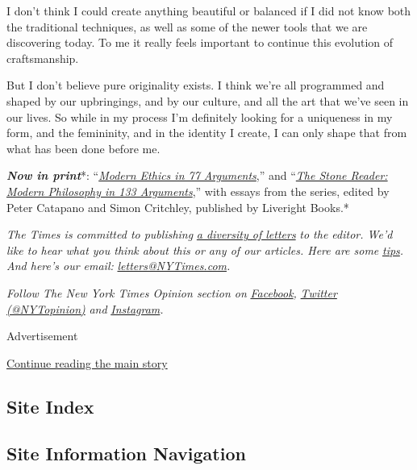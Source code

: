 I don't think I could create anything beautiful or balanced if I did not
know both the traditional techniques, as well as some of the newer tools
that we are discovering today. To me it really feels important to
continue this evolution of craftsmanship.

But I don't believe pure originality exists. I think we're all
programmed and shaped by our upbringings, and by our culture, and all
the art that we've seen in our lives. So while in my process I'm
definitely looking for a uniqueness in my form, and the femininity, and
in the identity I create, I can only shape that from what has been done
before me.

\emph{\textbf{Now in print}}*:
``\emph{\href{http://bitly.com/1MW2kN3}{\emph{Modern Ethics in 77
Arguments}}},'' and ``\emph{\href{http://bitly.com/1MW2kN3}{\emph{The
Stone Reader: Modern Philosophy in 133 Arguments}}},'' with essays from
the series, edited by Peter Catapano and Simon Critchley, published by
Liveright Books.*

\emph{The Times is committed to publishing}
\href{https://www.nytimes3xbfgragh.onion/2019/01/31/opinion/letters/letters-to-editor-new-york-times-women.html}{\emph{a
diversity of letters}} \emph{to the editor. We'd like to hear what you
think about this or any of our articles. Here are some}
\href{https://help.nytimes3xbfgragh.onion/hc/en-us/articles/115014925288-How-to-submit-a-letter-to-the-editor}{\emph{tips}}\emph{.
And here's our email:}
\href{mailto:letters@NYTimes.com}{\emph{letters@NYTimes.com}}\emph{.}

\emph{Follow The New York Times Opinion section on}
\href{https://www.facebookcorewwwi.onion/nytopinion}{\emph{Facebook}}\emph{,}
\href{http://twitter.com/NYTOpinion}{\emph{Twitter (@NYTopinion)}}
\emph{and}
\href{https://www.instagram.com/nytopinion/}{\emph{Instagram}}\emph{.}

Advertisement

\protect\hyperlink{after-bottom}{Continue reading the main story}

\hypertarget{site-index}{%
\subsection{Site Index}\label{site-index}}

\hypertarget{site-information-navigation}{%
\subsection{Site Information
Navigation}\label{site-information-navigation}}

